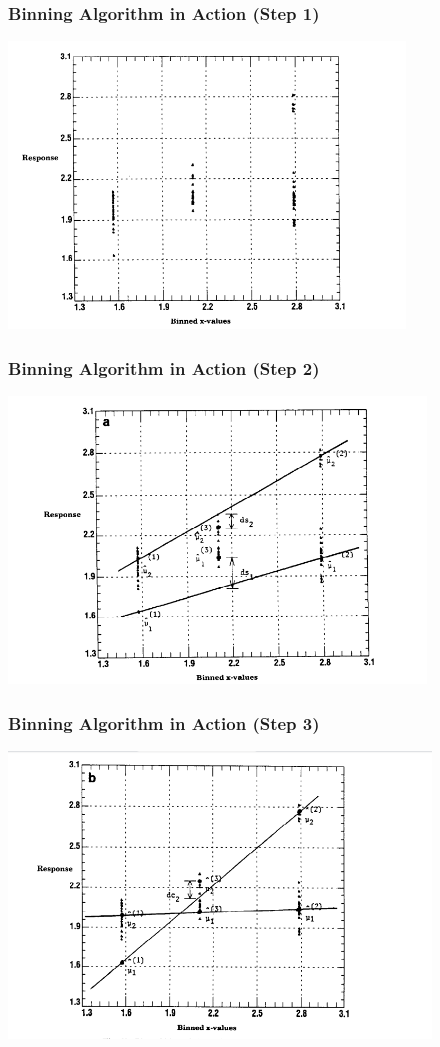 \documentclass{beamer}
\begin{document}
\begin{frame}
	\frametitle{Binning Algorithm in Action (Step 1)}
	\includegraphics[height = 3in]{./mm_1.png}
\end{frame}

\begin{frame}
	\frametitle{Binning Algorithm in Action (Step 2)}
	\includegraphics[height = 3in]{./mm_2.png}
\end{frame}

\begin{frame}
	\frametitle{Binning Algorithm in Action (Step 3)}
	\includegraphics[height = 3in]{./mm_3.png}
\end{frame}
\end{document}
